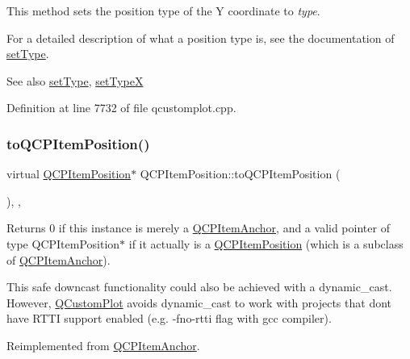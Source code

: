 This method sets the position type of the Y coordinate to {\itshape type}.

For a detailed description of what a position type is, see the documentation of \hyperlink{class_q_c_p_item_position_aa476abf71ed8fa4c537457ebb1a754ad}{set\+Type}.

\begin{DoxySeeAlso}{See also}
\hyperlink{class_q_c_p_item_position_aa476abf71ed8fa4c537457ebb1a754ad}{set\+Type}, \hyperlink{class_q_c_p_item_position_a2113b2351d6d00457fb3559a4e20c3ea}{set\+TypeX} 
\end{DoxySeeAlso}


Definition at line 7732 of file qcustomplot.\+cpp.

\mbox{\label{class_q_c_p_item_position_a577a7efc601df85a20b3e709d1ac320e}} 
\subsubsection{\texorpdfstring{to\+Q\+C\+P\+Item\+Position()}{toQCPItemPosition()}}
{\footnotesize\ttfamily virtual \hyperlink{class_q_c_p_item_position}{Q\+C\+P\+Item\+Position}$\ast$ Q\+C\+P\+Item\+Position\+::to\+Q\+C\+P\+Item\+Position (\begin{DoxyParamCaption}{ }\end{DoxyParamCaption})\hspace{0.3cm}{\ttfamily [inline]}, {\ttfamily [protected]}, {\ttfamily [virtual]}}

Returns 0 if this instance is merely a \hyperlink{class_q_c_p_item_anchor}{Q\+C\+P\+Item\+Anchor}, and a valid pointer of type Q\+C\+P\+Item\+Position$\ast$ if it actually is a \hyperlink{class_q_c_p_item_position}{Q\+C\+P\+Item\+Position} (which is a subclass of \hyperlink{class_q_c_p_item_anchor}{Q\+C\+P\+Item\+Anchor}).

This safe downcast functionality could also be achieved with a dynamic\+\_\+cast. However, \hyperlink{class_q_custom_plot}{Q\+Custom\+Plot} avoids dynamic\+\_\+cast to work with projects that don\textquotesingle{}t have R\+T\+TI support enabled (e.\+g. -\/fno-\/rtti flag with gcc compiler). 

Reimplemented from \hyperlink{class_q_c_p_item_anchor_ac54b20120669950255a63587193dbb86}{Q\+C\+P\+Item\+Anchor}.



